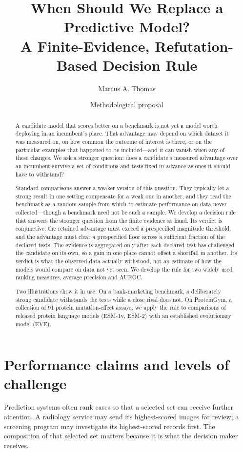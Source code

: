 \documentclass[11pt]{article}
\title{When Should We Replace a Predictive Model?\\
\large A Finite-Evidence, Refutation-Based Decision Rule}
\author{Marcus A. Thomas}
\date{Methodological proposal}
\theoremstyle{remark}
\begin{document}
\maketitle

\begin{abstract}
A candidate model that scores better on a benchmark is not yet a model worth
deploying in an incumbent's place. That advantage may depend on which dataset it
was measured on, on how common the outcome of interest is there, or on the
particular examples that happened to be included---and it can vanish when any of
these changes. We ask a stronger question: does a candidate's measured advantage
over an incumbent survive a set of conditions and tests fixed in advance as ones
it should have to withstand?

Standard comparisons answer a weaker version of this question. They typically
let a strong result in one setting compensate for a weak one in another, and
they read the benchmark as a random sample from which to estimate performance on
data never collected---though a benchmark need not be such a sample. We develop a
decision rule that answers the stronger question from the finite evidence at
hand. Its verdict is conjunctive: the retained advantage must exceed a
prespecified magnitude threshold, and the advantage must clear a prespecified
floor across a sufficient fraction of the declared tests. The evidence is
aggregated only after each declared test has challenged the candidate on its
own, so a gain in one place cannot offset a shortfall in another. Its verdict is
what the observed data actually withstood, not an estimate of how the models
would compare on data not yet seen. We develop the rule for two widely used
ranking measures, average precision and AUROC.

Two illustrations show it in use. On a bank-marketing benchmark, a deliberately
strong candidate withstands the tests while a close rival does not. On
ProteinGym, a collection of 91 protein mutation-effect assays, we apply the rule
to comparisons of released protein language models (ESM-1v, ESM-2) with an
established evolutionary model (EVE).
\end{abstract}


\section{Performance claims and levels of challenge}
\label{sec:introduction}

Prediction systems often rank cases so that a selected set can receive further
attention. A radiology service may send its highest-scored images for review;
a screening program may investigate its highest-scored records first. The
composition of that selected set matters because it is what the decision maker
receives.
\end{document}
